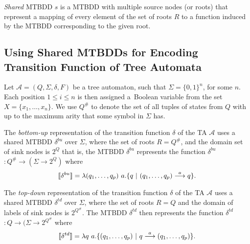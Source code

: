 \emph{Shared} MTBDD $s$ is a MTBDD with multiple source nodes (or roots) that
represent a mapping of every element of the set of roots $R$ to a function
induced by the MTBDD corresponding to the given root.

\subsection[Usage of MTBDDs with TA]{Using Shared MTBDDs for Encoding
Transition Function of Tree Automata} Let $\mathcal{A} = (Q, \Sigma, \delta, F)$
be a tree automaton, such that $\Sigma = \{0, 1\}^n$, for some $n$. Each
position $1 \leq i \leq n$ is then assigned a~Boolean variable from the set $X =
\{x_1,\ldots,x_n\}$. We use $Q^\#$ to denote the set of all tuples of states from $Q$ with up to the
maximum arity that some symbol in $\Sigma$ has.

The \emph{bottom-up} representation of the transition function $\delta$ of the
TA $\mathcal{A}$ uses a shared MTBDD $\delta^{bu}$ over $\Sigma$, where the set
of roots $R = Q^\#$, and the domain set of sink nodes is $2^Q$ that is, the
MTBDD $\delta^{bu}$ represents the function \textlbrackdbl $\delta^{bu}$
\textrbrackdbl $: Q^\# \rightarrow (\Sigma \rightarrow 2^Q)$ where
 \begin{equation}
  \text{\textlbrackdbl} \delta^{bu} \text{\textrbrackdbl} =
 \lambda (q_1,\ldots,q_p)\ a . \{q\ |\ (q_1,\ldots,q_p)
 \overset{a}{\longrightarrow} q\}. \end{equation}

The \emph{top-down} representation of the transition function $\delta$ of the TA
$\mathcal{A}$ uses a shared MTBDD $\delta^{td}$ over $\Sigma$, where the set of
roots $R = Q$ and the domain of labels of sink nodes is $2^{Q^\#}$. The MTBDD
$\delta^{td}$ then represents the function \textlbrackdbl $\delta^{td}$
\textrbrackdbl $: Q \rightarrow (\Sigma \rightarrow 2^{Q^\#}$ where
\begin{equation} \text{\textlbrackdbl} \delta^{td} \text{\textrbrackdbl} =
\lambda q\ a .
\{(q_1,\ldots,q_p)\ |\ q \overset{a}{\longrightarrow} (q_1,\ldots,q_p)\}.
\end{equation}

